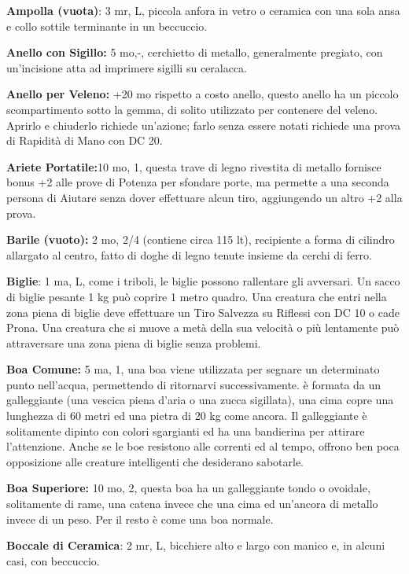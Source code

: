 \documentclass[a4paper,11pt,twoside,openany]{book}
\begin{document}
{\textbf{Ampolla (vuota)}: 3 mr, L, piccola anfora in vetro o ceramica con una sola ansa e collo sottile terminante in un beccuccio.

\textbf{Anello con Sigillo:} 5 mo,-, cerchietto di metallo, generalmente pregiato, con un'incisione atta ad imprimere sigilli su ceralacca. 

\textbf{Anello per Veleno:} +20 mo rispetto a costo anello, questo anello ha un piccolo scompartimento sotto la gemma, di solito utilizzato per contenere del veleno. Aprirlo e chiuderlo richiede un'azione; farlo senza essere notati richiede una prova di Rapidità di Mano con DC 20.

\textbf{Ariete Portatile:}10 mo, 1, questa trave di legno rivestita di metallo fornisce bonus +2 alle prove di Potenza per sfondare porte, ma permette a una seconda persona di Aiutare senza dover effettuare alcun tiro, aggiungendo un altro +2 alla prova.

\textbf{Barile (vuoto):} 2 mo, 2/4 (contiene circa 115 lt), recipiente a forma di cilindro allargato al centro, fatto di doghe di legno tenute insieme da cerchi di ferro.

\textbf{Biglie}: 1 ma, L, come i triboli, le biglie possono rallentare gli avversari. Un sacco di biglie pesante 1 kg può coprire 1 metro quadro. Una creatura che entri nella zona piena di biglie deve effettuare un Tiro Salvezza su Riflessi con DC 10 o cade Prona. Una creatura che si muove a metà della sua velocità o più lentamente può attraversare una zona piena di biglie senza problemi.

\textbf{Boa Comune:} 5 ma, 1, una boa viene utilizzata per segnare un determinato punto nell'acqua, permettendo di ritornarvi successivamente. è formata da un galleggiante (una vescica piena d'aria o una zucca sigillata), una cima copre una lunghezza di 60 metri ed una pietra di 20 kg come ancora. Il galleggiante è solitamente dipinto con colori sgargianti ed ha una bandierina per attirare l'attenzione. Anche se le boe resistono alle correnti ed al tempo, offrono ben poca opposizione alle creature intelligenti che desiderano sabotarle.

\textbf{Boa Superiore:} 10 mo, 2, questa boa ha un galleggiante tondo o ovoidale, solitamente di rame, una catena invece che una cima ed un'ancora di metallo invece di un peso. Per il resto è come una boa normale.

\textbf{Boccale di Ceramica}: 2 mr, L, bicchiere alto e largo con manico e, in alcuni casi, con beccuccio.

}
\end{document}

